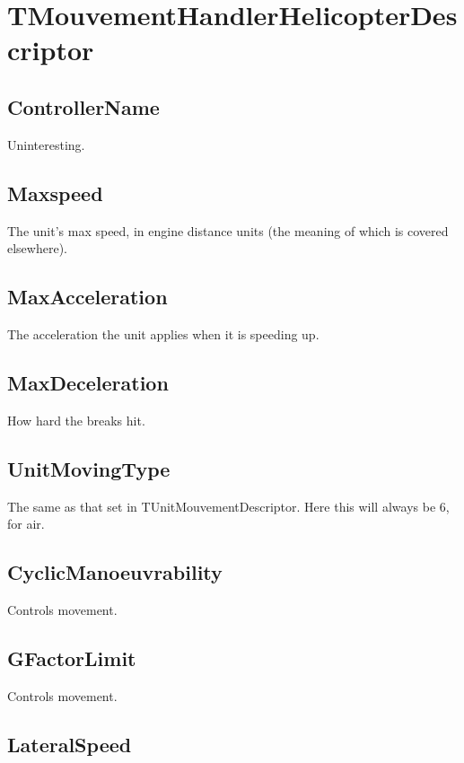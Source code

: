 \documentclass{article}
\begin{document}
\section{TMouvementHandlerHelicopterDescriptor}

\subsection{ControllerName}

Uninteresting.

\subsection{Maxspeed}

The unit's max speed, in engine distance units (the meaning of which is covered elsewhere).

\subsection{MaxAcceleration}

The acceleration the unit applies when it is speeding up.

\subsection{MaxDeceleration}

How hard the breaks hit.

\subsection{UnitMovingType}

The same as that set in TUnitMouvementDescriptor. Here this will always be 6, for air.

\subsection{CyclicManoeuvrability}

Controls movement.

\subsection{GFactorLimit}

Controls movement.

\subsection{LateralSpeed}
\end{document}
